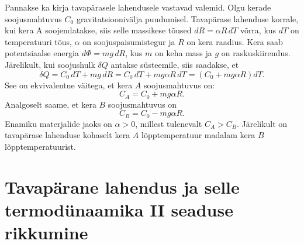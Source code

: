 \documentclass{trkut}%
\begin{document}
Pannakse ka kirja tavapärasele lahendusele vastavad valemid. Olgu kerade soojusmahtuvus $C_0$ gravitatsioonivälja puudumisel. Tavapärase lahenduse korrale, kui kera A soojendatakse, siis selle massikese tõused $dR=\alpha R \, dT$ võrra, kus $dT$ on temperatuuri tõus, $\alpha$ on soojuspaisumistegur ja $R$ on kera raadius. Kera saab potentsiaalse energia $d\Phi = mg \, dR$, kus $m$ on keha mass ja $g$ on raskuskiirendus. Järelikult, kui soojushulk \(\delta Q\) antakse süsteemile, siis saadakse, et
\begin{equation}
    \delta Q = C_0 \, dT + mg \, dR = C_0 \, dT + mg\alpha R \, dT = (C_0 +  mg\alpha R) dT.
\end{equation}
See on ekvivalentne väitega, et kera \(A\) soojusmahtuvus on:
\begin{equation}
    C_A = C_0 + mg\alpha R.
\end{equation}
Analgoselt saame, et kera \(B\) soojusmahtuvus on
\begin{equation}
    C_B = C_0 - mg\alpha R.
\end{equation}
Enamiku materjalide jaoks on \(\alpha > 0\), millest tulenevalt \(C_A>C_B\). Järelikult on tavapärase lahenduse kohaselt kera \(A\) lõpptemperatuur madalam kera \(B\) lõpptemperatuurist.

\section{Tavapärane lahendus ja selle termodünaamika II seaduse rikkumine}
\end{document}
